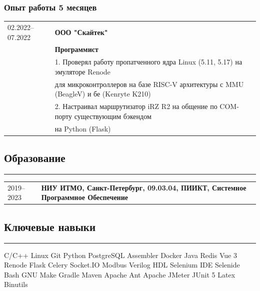 \documentclass[10pt, final, twoside]{article}
\newcommand{\skill}[1]{\colorbox{darkgray4}{\textcolor{darkgray2}{#1}}}
\begin{document}
  \subsubsection*{Опыт работы 5 месяцев}
  \begin{table}[H]
    \begin{tabular}{ll}
      02.2022--07.2022 & \textbf{ООО "Скайтек"}\\
                       & \textbf{Программист}\\
                       & 1. Проверял работу пропатченного ядра Linux (5.11, 5.17) на эмуляторе   Renode\\
                       & для микроконтроллеров на базе RISC-V архитектуры с MMU (BeagleV) и бе   (Kenryte K210)\\
                       & 2. Настраивал маршрутизатор iRZ R2 на общение по COM-порту    существующим бэкендом\\
                       & на Python (Flask)
    \end{tabular}
  \end{table}
  

  \subsection*{\textcolor{darkgray2}{Образование}}
  \vspace*{-5.5mm}
  \par\noindent\rule{\textwidth}{0.1pt}
  \begin{table}[H]
    \begin{tabular}{ll}
      2019--2023 & \textbf{НИУ ИТМО, Санкт-Петербург, 09.03.04, ПИИКТ, Системное Программное Обеспечение}
    \end{tabular}
  \end{table}

  \subsection*{\textcolor{darkgray2}{Ключевые навыки}}
  \vspace*{-5.5mm}
  \par\noindent\rule{\textwidth}{0.1pt}
    \skill{C/C++} \skill{Linux} \skill{Git} \skill{Python} \skill{PostgreSQL} \skill{Assembler} \skill{Docker} \skill{Java} \skill{Redis} \skill{Vue 3} \skill{Renode} \skill{Flask} \skill{Celery} \skill{Socket.IO} \skill{Modbus} \skill{Verilog HDL} \skill{Selenium IDE} \skill{Selenide} \skill{Bash} \skill{GNU Make} \skill{Gradle} \skill{Maven} \skill{Apache Ant} \skill{Apache JMeter} \skill{JUnit 5} \skill{Latex} \skill{Binutils}
    
\end{document}
